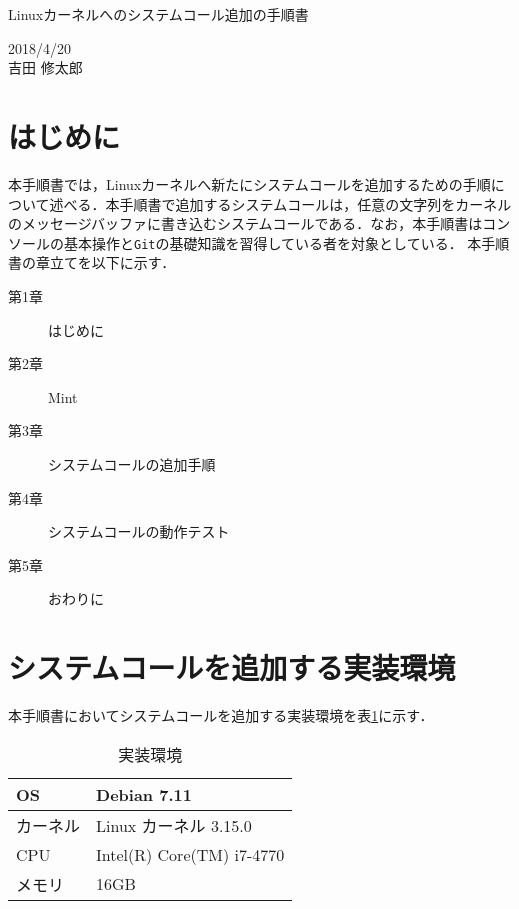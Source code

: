 \documentclass[12pt]{jsarticle}
\begin{document}
\begin{center}
  {\LARGE Linuxカーネルへのシステムコール追加の手順書}
\end{center}

\begin{flushright}
  2018/4/20\\
  吉田 修太郎
\end{flushright}
\section{はじめに}
本手順書では，Linuxカーネルへ新たにシステムコールを追加するための手順について述べる．本手順書で追加するシステムコールは，任意の文字列をカーネルのメッセージバッファに書き込むシステムコールである．なお，本手順書はコンソールの基本操作と\verb|Git|の基礎知識を習得している者を対象としている．
本手順書の章立てを以下に示す．
\begin{description}
\item[第1章] はじめに
\item[第2章] Mint
\item[第3章] システムコールの追加手順
\item[第4章] システムコールの動作テスト
\item[第5章] おわりに
\end{description}
\section{システムコールを追加する実装環境}\label{sec2}
本手順書においてシステムコールを追加する実装環境を表\ref{table1}に示す．
\begin{table}[h!]
  \begin{center}
    \caption{実装環境}%
    \begin{tabular}{l|l}
      \hline\hline
      OS & Debian 7.11 \\
      \hline
      カーネル & Linux カーネル 3.15.0 \\
      \hline
      CPU & Intel(R) Core(TM) i7-4770 \\
      \hline
      メモリ & 16GB\\
      \hline
    \end{tabular}
    \label{table1}
  \end{center}
\end{table}
\end{document}
